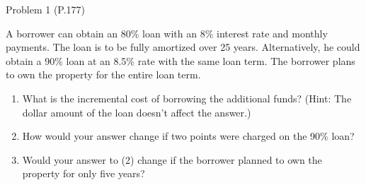 \documentclass[ignorenonframetext,]{beamer}
\providecommand{\tightlist}{%
\setlength{\itemsep}{0pt}\setlength{\parskip}{0pt}}
\begin{document}
\begin{frame}{Problem 1 (P.177)}

\small
A borrower can obtain an 80\% loan with an 8\% interest rate and monthly
payments. The loan is to be fully amortized over 25 years.
Alternatively, he could obtain a 90\% loan at an 8.5\% rate with the
same loan term. The borrower plans to own the property for the entire
loan term.

\begin{enumerate}
\def\labelenumi{\arabic{enumi}.}
\tightlist
\item
  What is the incremental cost of borrowing the additional funds? (Hint:
  The dollar amount of the loan doesn't affect the answer.)
\item
  How would your answer change if two points were charged on the 90\%
  loan?
\item
  Would your answer to (2) change if the borrower planned to own the
  property for only five years?
\end{enumerate}

\end{frame}
\end{document}
